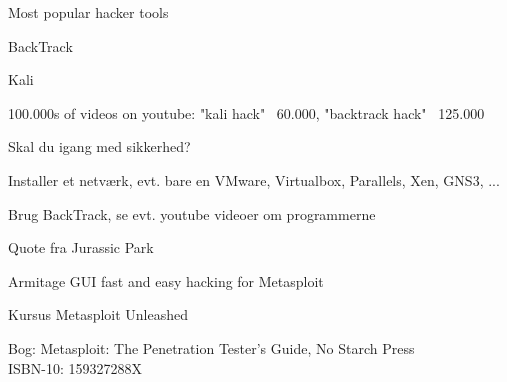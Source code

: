 \documentclass[20pt,landscape,a4paper,footrule]{foils}
\begin{document}
\vskip 5mm
\centerline{Most popular hacker tools }



\begin{list1}
\item BackTrack 
\item  Kali 
\item 100.000s of videos on youtube: "kali hack" ~60.000, "backtrack hack" ~125.000
\end{list1}




\begin{list1}
\item Skal du igang med sikkerhed?
\item Installer et netværk, evt. bare en VMware, Virtualbox, Parallels, Xen, GNS3, ...
\item Brug BackTrack, se evt. youtube videoer om programmerne
\end{list1}

Quote fra Jurassic Park





\begin{list1}
\item {}
\item Armitage GUI fast and easy hacking for Metasploit\\
\item Kursus Metasploit Unleashed\\
\item Bog: Metasploit: The Penetration Tester's Guide, No Starch Press\\
ISBN-10: 159327288X
\end{list1}



\end{document}
